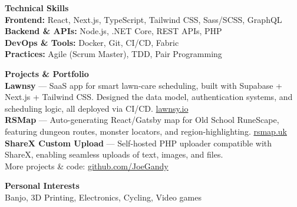 \documentclass[11pt,a4paper]{article}
\newcommand{\cvsection}[1]{\vspace{0.8em}\noindent\large\textbf{#1}\vspace{0.4em}\\}
\begin{document}
\cvsection{Technical Skills}
\textbf{Frontend:} React, Next.js, TypeScript, Tailwind CSS, Sass/SCSS, GraphQL \\
\textbf{Backend \& APIs:} Node.js, .NET Core, REST APIs, PHP \\
\textbf{DevOps \& Tools:} Docker, Git, CI/CD, Fabric \\
\textbf{Practices:} Agile (Scrum Master), TDD, Pair Programming

\cvsection{Projects \& Portfolio}
\textbf{Lawnsy} --- SaaS app for smart lawn-care scheduling, built with Supabase + Next.js + Tailwind CSS. Designed the data model, authentication systems, and scheduling logic, all deployed via CI/CD. \href{https://lawnsy.io}{lawnsy.io} \\
\textbf{RSMap} --- Auto-generating React/Gatsby map for Old School RuneScape, featuring dungeon routes, monster locators, and region-highlighting. \href{https://rsmap.uk}{rsmap.uk} \\
\textbf{ShareX Custom Upload} --- Self-hosted PHP uploader compatible with ShareX, enabling seamless uploads of text, images, and files. \\
More projects \& code: \href{https://github.com/JoeGandy}{github.com/JoeGandy}

\cvsection{Personal Interests}
Banjo, 3D Printing, Electronics, Cycling, Video games
\end{document}
